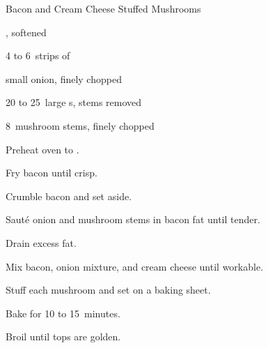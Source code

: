 \begin{recipe}{Bacon and Cream Cheese Stuffed Mushrooms}{}{}

\begin{ingredients}
\item {} , softened
\item 4 to 6~strips of 
\item small onion, finely chopped
\item 20 to 25~large s, stems removed
\item 8~mushroom stems, finely chopped
\end{ingredients}

\begin{directions}
\item Preheat oven to .
\item Fry bacon until crisp.
\item Crumble bacon and set aside.
\item Sauté onion and mushroom stems in bacon fat until tender.
\item Drain excess fat.
\item Mix bacon, onion mixture, and cream cheese until workable.
\item Stuff each mushroom and set on a baking sheet.
\item Bake for 10 to 15~minutes.
\item Broil until tops are golden.
\end{directions}

\end{recipe}
